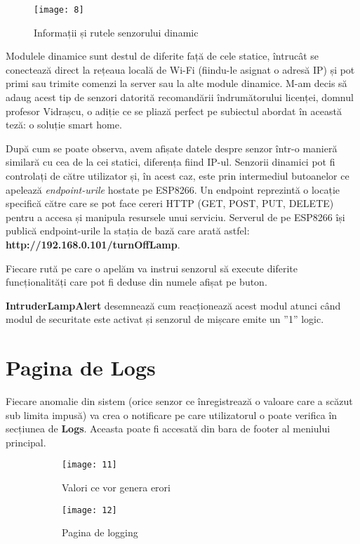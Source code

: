 \begin{wrapfigure}{r}{0.3\textwidth}
	\texttt{[image: 8]}
	\caption{Informații și rutele senzorului dinamic}
	\label{fig:8}
\end{wrapfigure}

Modulele dinamice sunt destul de diferite față de cele statice, întrucât se conectează direct la rețeaua locală de Wi-Fi (fiindu-le asignat o adresă IP) și pot primi sau trimite comenzi la server sau la alte module dinamice. M-am decis să adaug acest tip de senzori datorită recomandării îndrumătorului licenței, domnul profesor Vidrașcu, o adiție ce se pliază perfect pe subiectul abordat în această teză: o soluție smart home.

După cum se poate observa, avem afișate datele despre senzor într-o manieră similară cu cea de la cei statici, diferența fiind IP-ul. Senzorii dinamici pot fi controlați de către utilizator și, în acest caz, este prin intermediul butoanelor ce apelează \emph{endpoint-urile} hostate pe ESP8266. Un endpoint reprezintă o locație specifică către care se pot face cereri HTTP (GET, POST, PUT, DELETE) pentru a accesa și manipula resursele unui serviciu. Serverul de pe ESP8266 își publică endpoint-urile la stația de bază care arată astfel: \textbf{http://192.168.0.101/turnOffLamp}.

Fiecare rută pe care o apelăm va instrui senzorul să execute diferite funcționalități care pot fi deduse din numele afișat pe buton.

\textbf{IntruderLampAlert} desemnează cum reacționează acest modul atunci când modul de securitate este activat și senzorul de mișcare emite un ”1” logic.

\section{Pagina de Logs}

Fiecare anomalie din sistem (orice senzor ce înregistrează o valoare care a scăzut sub limita impusă) va crea o notificare pe care utilizatorul o poate verifica în secțiunea de \textbf{Logs}. Aceasta poate fi accesată din bara de footer al meniului principal.

\begin{figure}[h]
	\centering
	\begin{subfigure}{0.45\textwidth}
		\texttt{[image: 11]}
		\caption{Valori ce vor genera erori}
		\label{fig:11}
	\end{subfigure}
	\hfill
	\begin{subfigure}{0.45\textwidth}
		\texttt{[image: 12]}
		\caption{Pagina de logging}
		\label{fig:12}
	\end{subfigure}
	\caption{}
	\label{fig:all5}
\end{figure}

